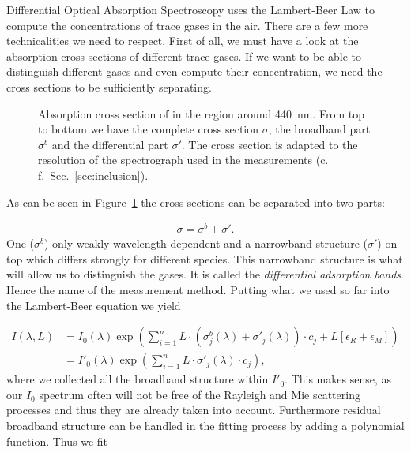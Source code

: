 Differential Optical Absorption Spectroscopy uses the Lambert-Beer Law
to compute the concentrations of trace gases in the air. There are a
few more technicalities we need to respect. First of all, we must have
a look at the absorption cross sections of different trace gases. If we
want to be able to distinguish different gases and even compute their
concentration, we need the cross sections to be sufficiently
separating.

\begin{figure}[htbp]
  \centering
  
  \caption{Absorption cross section of  in the region around
    \SI{440}{\nano\meter}. From top to bottom we have the complete
    cross section $\sigma$, the broadband part $\sigma^b$ and the
    differential part $\sigma'$. The cross section is adapted to the
    resolution of the spectrograph used in the measurements
    (c.\,f.\ Sec.~\ref{sec:inclusion}).}
  \label{fig:no2-cross}
\end{figure}

As can be seen in Figure~\ref{fig:no2-cross} the
cross sections can be separated into two parts: 

\begin{align*}
  \sigma = \sigma^b + \sigma'.
\end{align*}
One ($\sigma^b$) only weakly
wavelength dependent and a narrowband
structure ($\sigma'$) on top which differs strongly for different species. This
narrowband structure is what will allow us to distinguish the gases. It is
called the \emph{differential adsorption bands}. Hence the name of the measurement
method. Putting what we used so far into the Lambert-Beer equation we
yield

\begin{align*}
  I(\lambda, L) & = I_0(\lambda) \exp \left ( \sum_{i=1}^n L \cdot
                  (\sigma^b_j(\lambda) + \sigma'_j(\lambda))\cdot c_j + L[\epsilon_R +
                  \epsilon_M]\right) \\
                & = I'_0(\lambda) \exp \left( \sum_{i=1}^n L \cdot
                  \sigma'_j(\lambda) \cdot c_j \right),
\end{align*}
where we collected all the broadband structure within $I'_0$. This
makes sense, as our $I_0$ spectrum often will not be free of the Rayleigh
and Mie scattering processes and thus they are already taken into
account. Furthermore residual broadband structure can be handled in
the fitting process by adding a polynomial function. Thus we fit

